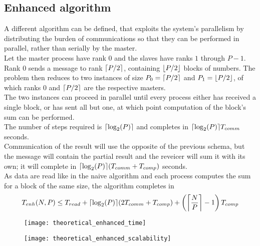 \documentclass[a4paper, 11pt]{article}
\DeclarePairedDelimiter{\ceil}{\lceil}{\rceil}
\DeclarePairedDelimiter{\floor}{\lfloor}{\rfloor}
\begin{document}
\subsection{Enhanced algorithm}
A different algorithm can be defined, that exploits the system's parallelism by distributing the burden of communications so that they can be performed in parallel, rather than serially by the master.\\
Let the master process have rank $0$ and the slaves have ranks $1$ through $P-1$.\\
Rank $0$ sends a message to rank $\ceil*{P/2}$, containing $\floor*{P/2}$ blocks of numbers. The problem then reduces to two instances of size $P_{0}=\ceil*{P/2}$ and $P_{1}=\floor*{P/2}$, of which ranks $0$ and $\ceil*{P/2}$ are the respective masters.\\
The two instances can proceed in parallel until every process either has received a single block, or has sent all but one, at which point computation of the block's sum can be performed.\\
The number of steps required is $\ceil*{\log_{2}(P)}$ and completes in $\ceil*{\log_{2}(P)}T_{comm}$ seconds.\\
Communication of the result will use the opposite of the previous schema, but the message will contain the partial result and the reveicer will sum it with its own; it will complete in $\ceil*{\log_{2}(P)}(T_{comm} + T_{comp})$ seconds.\\
As data are read like in the naive algorithm and each process computes the sum for a block of the same size, the algorithm completes in
$$T_{enh}(N, P) \leq T_{read} + \ceil*{\log_{2}(P)} (2T_{comm} + T_{comp}) + \left(\ceil[\bigg]{\frac{N}{P}}-1\right)T_{comp}$$
\begin{figure}
\centering
\begin{minipage}{.5\textwidth}
  \centering
  \texttt{[image: theoretical\_enhanced\_time]}
  \label{fig:theoretical_enhanced_time}
\end{minipage}%
\begin{minipage}{.5\textwidth}
  \centering
  \texttt{[image: theoretical\_enhanced\_scalability]}
  \label{fig:theoretical_enhanced_scalability}
\end{minipage}
\end{figure}
\end{document}
